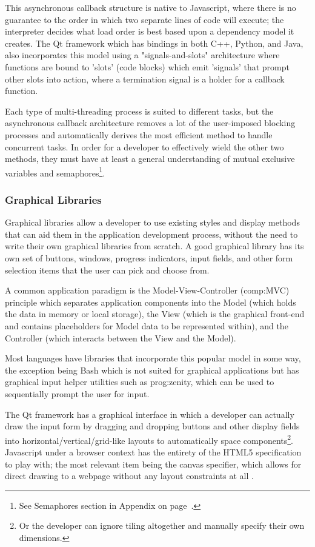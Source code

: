 This asynchronous callback structure is native to Javascript, where there is no guarantee to the order in which two separate lines of code will execute; the interpreter decides what load order is best based upon a dependency model it creates. The Qt framework which has bindings in both C++, Python, and Java, also incorporates this model using a "signals-and-slots" architecture where functions are bound to 'slots' (code blocks) which emit 'signals' that prompt other slots into action, where a termination signal is a holder for a callback function.

Each type of multi-threading process is suited to different tasks, but the asynchronous callback architecture removes a lot of the user-imposed blocking processes and automatically derives the most efficient method to handle concurrent tasks. In order for a developer to effectively wield the other two methods, they must have at least a general understanding of mutual exclusive variables and semaphores\footnote{See Semaphores section in Appendix on page~\pageref{ref:app:semaphores}.}. 


\subsubsection{Graphical Libraries}

Graphical libraries allow a developer to use existing styles and display methods that can aid them in the application development process, without the need to write their own graphical libraries from scratch. A good graphical library has its own set of buttons, windows, progress indicators, input fields, and other form selection items that the user can pick and choose from.

A common application paradigm is the Model-View-Controller (\gls{comp:MVC}) principle which separates application components into the Model (which holds the data in memory or local storage), the View (which is the graphical front-end and contains placeholders for Model data to be represented within), and the Controller (which interacts between the View and the Model). 

Most languages have libraries that incorporate this popular model in some way, the exception being Bash which is not suited for graphical applications but has graphical input helper utilities such as \gls{prog:zenity}, which can be used to sequentially prompt the user for input.

The Qt framework has a graphical interface in which a developer can actually draw the input form by dragging and dropping buttons and other display fields into horizontal/vertical/grid-like layouts to automatically space components\footnote{Or the developer can ignore tiling altogether and manually specify their own dimensions.}. Javascript under a browser context has the entirety of the HTML5 specification to play with; the most relevant item being the canvas specifier, which allows for direct drawing to a webpage without any layout constraints at all \cite{html5}.

